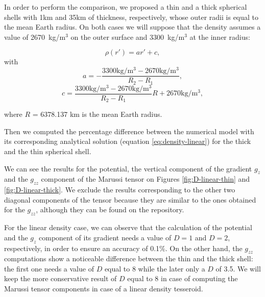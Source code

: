 \documentclass[extra]{gji}
\begin{document}
In order to perform the comparison, we proposed a thin and a thick 
spherical shells with 1km and 35km of thickness, respectively, whose 
outer radii is equal to the mean Earth radius.
On both cases we will suppose that the density assumes a value of 
2670~kg/m$^3$ on the outer surface and 3300~kg/m$^3$ at the inner 
radius:

\begin{equation}
    \rho(r') = ar' + c,
    \label{eq:density-linear}
\end{equation}
\noindent with 
\begin{equation}
    a = -\frac{3300\text{kg/m$^3$} - 2670\text{kg/m$^3$}}{R_2 - R_1},
\end{equation}
\begin{equation}
    c = \frac{3300\text{kg/m$^3$} - 
        2670\text{kg/m$^3$}}{R_2 - R_1} R + 
        2670\text{kg/m$^3$},
\end{equation}

\noindent where $R$ = 6378.137 km is the mean Earth radius.

Then we computed the percentage difference between the numerical model 
with its corresponding analytical solution (equation 
\ref{eq:density-linear}) for the thick and the thin spherical shell.

We can see the results for the potential, the vertical component of the 
gradient $g_z$ and the $g_{zz}$ component of the Marussi tensor on 
Figures \ref{fig:D-linear-thin} and \ref{fig:D-linear-thick}.
We exclude the results corresponding to the other two diagonal 
components of the tensor because they are similar to the ones obtained 
for the $g_{zz}$, although they can be found on the repository. 

For the linear density case, we can observe that the calculation of the 
potential and the $g_z$ component of its gradient needs a value of 
$D=1$ and $D=2$, respectively, in order to ensure an accuracy of 0.1\%.
On the other hand, the $g_{zz}$ computations show a noticeable 
difference between the thin and the thick shell: the first one needs a 
value of $D$ equal to 8 while the later only a $D$ of 3.5.
We will keep the more conservative result of $D$ equal to 8 in case of 
computing the Marussi tensor components in case of a linear density 
tesseroid.
\end{document}
